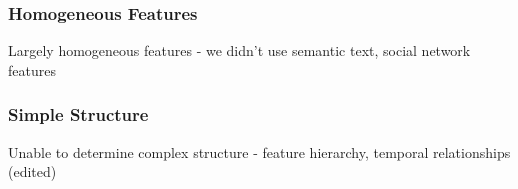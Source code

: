 \documentclass[../thesis/thesis.tex]{subfiles}
\begin{document}
\subsubsection{Homogeneous Features} %
Largely homogeneous features - we didn't use semantic text, social network features

\subsubsection{Simple Structure} %
Unable to determine complex structure - feature hierarchy, temporal relationships (edited)

\end{document}
